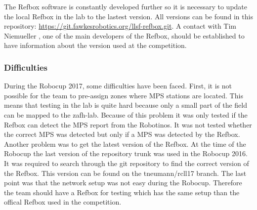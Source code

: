 The Refbox software is constantly developed further so it is necessary to update the local Refbox in the lab to the lastest version. All versions can be found in this repository: \url{https://git.fawkesrobotics.org/llsf-refbox.git}. A contact with Tim Niemueller \cite{RC2017}, one of the main developers of the Refbox, should be established to have information about the version used at the competition. \\


\subsubsection{Difficulties}

During the Robocup 2017, some difficulties have been faced. First, it is not possible for the team to pre-assign zones where MPS stations are located. This means that testing in the lab is quite hard because only a small part of the field can be mapped to the zafh-lab. Because of this problem it was only tested if the Refbox can detect the MPS report from the Robotinos. It was not tested whether the correct MPS was detected but only if a MPS was detected by the Refbox. Another problem was to get the latest version of the Refbox. At the time of the Robocup the last version of the repository trunk was used in the Robocup 2016. It was required to search through the git repository to find the correct version of the Refbox. This version can be found on the tneumann/rcll17 branch. The last point was that the network setup was not easy during the Robocup. Therefore the team should have a Refbox for testing which has the same setup than the offical Refbox used in the competition. \\
